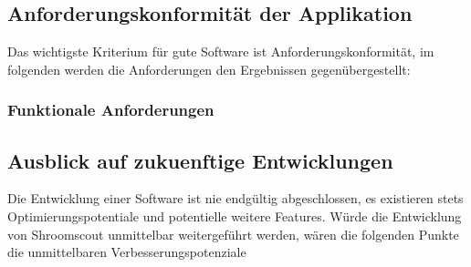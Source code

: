\documentclass[../main.tex]{subfiles}
\begin{document}
\subsection{Anforderungskonformität der Applikation}
Das wichtigste Kriterium für gute Software ist Anforderungskonformität, im folgenden werden die Anforderungen den Ergebnissen gegenübergestellt:
\subsubsection{Funktionale Anforderungen}

\subsection{Ausblick auf zukuenftige Entwicklungen}
Die Entwicklung einer Software ist nie endgültig abgeschlossen, es existieren stets Optimierungspotentiale und potentielle weitere Features.
Würde die Entwicklung von Shroomscout unmittelbar weitergeführt werden, wären die folgenden Punkte die unmittelbaren Verbesserungspotenziale
\end{document}
